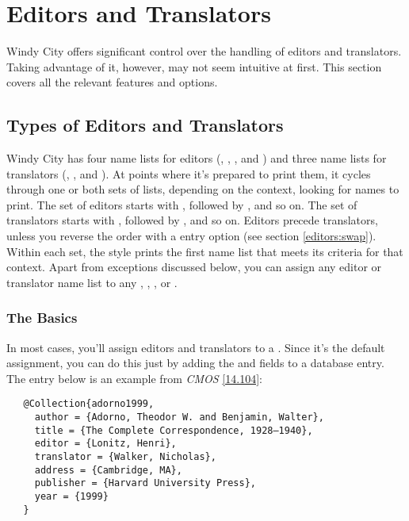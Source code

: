\documentclass[11pt,letterpaper,oneside]{article}
\begin{document}
\section{Editors and Translators}
\label{editors}

Windy City offers significant control over the handling of editors and
translators. Taking advantage of it, however, may not seem intuitive
at first. This section covers all the relevant features and options.

\subsection{Types of Editors and Translators}

Windy City has four name lists for editors (,
, , and ) and
three name lists for translators (,
, and ). At points where
it's prepared to print them, it cycles through one or both sets of
lists, depending on the context, looking for names to print. The set
of editors starts with , followed by
, and so on. The set of translators starts with
, followed by , and so on.
Editors precede translators, unless you reverse the order with a
 entry option (see section \ref{editors:swap}). Within
each set, the style prints the first name list that meets its criteria
for that context. Apart from exceptions discussed below, you can
assign any editor or translator name list to any ,
, , or .

\subsubsection{The Basics}
\label{editors:basics}

In most cases, you'll assign editors and translators to a
. Since it's the default assignment, you can do this
just by adding the  and  fields
to a database entry. The entry below is an example from \textit{CMOS}
\ref{14.104}:

\begin{verbatim}
   @Collection{adorno1999,
     author = {Adorno, Theodor W. and Benjamin, Walter},
     title = {The Complete Correspondence, 1928–1940},
     editor = {Lonitz, Henri},
     translator = {Walker, Nicholas},
     address = {Cambridge, MA},
     publisher = {Harvard University Press},
     year = {1999}
   }
\end{verbatim}
\end{document}
